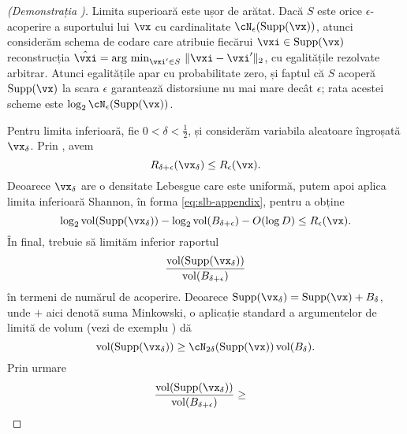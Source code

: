 \documentclass[../../book-main_ro.tex]{subfiles}
\begin{document}
\begin{proof}[(Demonstrația )]
    Limita superioară este ușor de arătat. Dacă $S$ este orice $\epsilon$-acoperire a
    suportului lui $\vx$ cu cardinalitate $\cN_{\epsilon}(\Supp(\vx))$, atunci considerăm
    schema de codare care atribuie fiecărui $\vxi \in \Supp(\vx)$ reconstrucția
    $\hat{\vxi} = \argmin_{\vxi' \in S}\, \norm{\vxi - \vxi'}_2$, cu egalitățile
    rezolvate arbitrar. Atunci egalitățile apar cu probabilitate zero, și faptul că
    $S$ acoperă $\Supp(\vx)$ la scara $\epsilon$ garantează distorsiune nu mai mare
    decât $\epsilon$; rata acestei scheme este $\log_2 \cN_{\epsilon}(\Supp(\vx))$.

    Pentru limita inferioară, fie $0 < \delta < \tfrac{1}{2}$, și considerăm
    variabila aleatoare îngroșată $\vx_{\delta}$. Prin
    , avem
    \begin{equation}
        R_{\delta + \epsilon}(\vx_{\delta})
        \leq
        R_{\epsilon}(\vx).
    \end{equation}
    Deoarece $\vx_{\delta}$ are o densitate Lebesgue care este uniformă, putem apoi
    aplica limita inferioară Shannon, în forma \eqref{eq:slb-appendix}, pentru a obține
    \begin{equation}\label{eq:slb-proof}
        \log_2 \volume(\Supp(\vx_{\delta}))
        - \log_2 \volume(B_{\delta + \epsilon})
        - O(\log D)
        \leq
        R_{\epsilon}(\vx).
    \end{equation}
    În final, trebuie să limităm inferior raportul
    \begin{equation}
        \frac{
            \volume(\Supp(\vx_{\delta}))
        }
        {
            \volume(B_{\delta + \epsilon})
        }
    \end{equation}
    în termeni de numărul de acoperire.
    Deoarece $\Supp(\vx_{\delta}) = \Supp(\vx) + B_{\delta}$, unde $+$ aici
    denotă suma Minkowski, o aplicație standard a argumentelor de limită de volum
    (vezi de exemplu \cite[Propoziția 4.2.12]{Vershynin2018-br}) dă
    \begin{equation}
        \volume(\Supp(\vx_{\delta}))
        \geq
        \cN_{2\delta}(\Supp(\vx))
        \volume(B_{\delta}).
    \end{equation}
    Prin urmare
    \begin{align}
        \frac{
            \volume(\Supp(\vx_{\delta}))
        }
        {
            \volume(B_{\delta + \epsilon})
        }
        &\geq

\end{align}
\end{proof}
\end{document}
